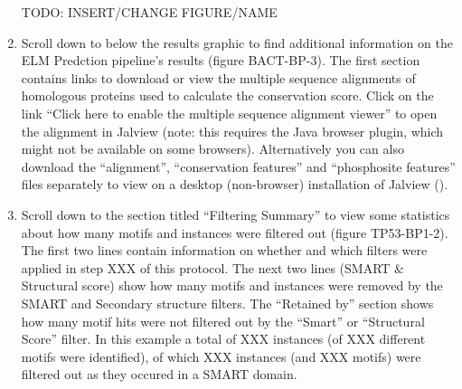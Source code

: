 \begin{enumerate}
TODO: INSERT/CHANGE FIGURE/NAME

\item Scroll down to below the results graphic to find additional information
	on the ELM Predction pipeline's results (figure BACT-BP-3).  The first
	section contains links to download or view the multiple sequence
	alignments of homologous proteins used to calculate the conservation
	score. Click on the link ``Click here to enable the multiple sequence
	alignment viewer'' to open the alignment in Jalview (note: this
	requires the Java browser plugin, which might not be available on some
	browsers). Alternatively you can also download the ``alignment'',
	``conservation features'' and ``phosphosite features'' files separately
	to view on a desktop (non-browser) installation of Jalview
	(\cite{19151095}).


\item Scroll down to the section titled ``Filtering Summary'' to view some
	statistics about how many motifs and instances were filtered out
	(figure TP53-BP1-2). The first two lines contain information on whether
	and which filters were applied in step XXX of this protocol. The next
	two lines (SMART \& Structural score) show how many motifs and
	instances were removed by the SMART and Secondary structure filters.
	The ``Retained by'' section shows how many motif hits were not filtered
	out by the ``Smart'' or ``Structural Score'' filter. In this example a
	total of XXX instances (of XXX different motifs were identified), of
	which XXX instances (and XXX motifs) were filtered out as they occured
	in a SMART domain.



\end{enumerate}
